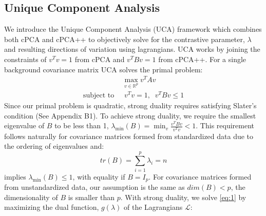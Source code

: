 \documentclass[12pt]{article}
\begin{document}
\subsection{Unique Component Analysis}
We introduce the Unique Component Analysis (UCA) framework which combines both cPCA and cPCA++ to objectively solve for the contrastive parameter, $\lambda$ and resulting directions of variation using lagrangians. UCA works by joining the constraints of $v^T v = 1$ from cPCA and $v^T Bv = 1$ from cPCA++. For a single background covariance matrix UCA solves the primal problem: 
\begin{align}
  &\max_{v\in \mathbb{R}^p}{v^TAv} \label{eq:1} \\ \text{subject to }&\; v^{T}v=1,\;\; v^TBv \leq 1 \nonumber
\end{align}
Since our primal problem is quadratic, strong duality requires satisfying Slater's condition\cite{boyd2004convex} (See Appendix B1).
To achieve strong duality, we require the smallest eigenvalue of $B$ to be less than 1, $\lambda_{\min}\left(B\right) = \min_{v}\frac{v^T B v}{v^T v}< 1$.
This requirement follows naturally for covariance matrices formed from standardized data due to the ordering of eigenvalues and:
\[tr(B) = \sum_{i = 1}^{p} \lambda_i = n\]
implies $\lambda_{\min}(B)\leq 1$, with equality if $B = I_p$.
For covariance matrices formed from unstandardized data, our assumption is the same as $dim(B) < p$, the dimensionality of $B$ is smaller than $p$. 
With strong duality, we solve \ref{eq:1} by maximizing the dual function, $g(\lambda)$ of the Lagrangians $\mathcal{L}$:
\end{document}
